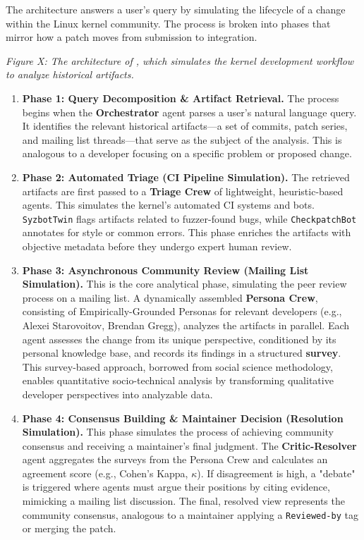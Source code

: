 The \sys architecture answers a user's query by simulating the lifecycle of a change within the Linux kernel community. The process is broken into phases that mirror how a patch moves from submission to integration.

\emph{Figure X: The architecture of \sys, which simulates the kernel development workflow to analyze historical artifacts.}

\begin{enumerate}
\item \textbf{Phase 1: Query Decomposition \& Artifact Retrieval.} The process begins when the \textbf{Orchestrator} agent parses a user's natural language query. It identifies the relevant historical artifacts—a set of commits, patch series, and mailing list threads—that serve as the subject of the analysis. This is analogous to a developer focusing on a specific problem or proposed change.

\item \textbf{Phase 2: Automated Triage (CI Pipeline Simulation).} The retrieved artifacts are first passed to a \textbf{Triage Crew} of lightweight, heuristic-based agents. This simulates the kernel's automated CI systems and bots. \texttt{SyzbotTwin} flags artifacts related to fuzzer-found bugs, while \texttt{CheckpatchBot} annotates for style or common errors. This phase enriches the artifacts with objective metadata before they undergo expert human review.

\item \textbf{Phase 3: Asynchronous Community Review (Mailing List Simulation).} This is the core analytical phase, simulating the peer review process on a mailing list. A dynamically assembled \textbf{Persona Crew}, consisting of Empirically-Grounded Personas for relevant developers (e.g., Alexei Starovoitov, Brendan Gregg), analyzes the artifacts in parallel. Each agent assesses the change from its unique perspective, conditioned by its personal knowledge base, and records its findings in a structured \textbf{survey}. This survey-based approach, borrowed from social science methodology, enables quantitative socio-technical analysis by transforming qualitative developer perspectives into analyzable data.

\item \textbf{Phase 4: Consensus Building \& Maintainer Decision (Resolution Simulation).} This phase simulates the process of achieving community consensus and receiving a maintainer's final judgment. The \textbf{Critic-Resolver} agent aggregates the surveys from the Persona Crew and calculates an agreement score (e.g., Cohen's Kappa, $\kappa$). If disagreement is high, a "debate" is triggered where agents must argue their positions by citing evidence, mimicking a mailing list discussion. The final, resolved view represents the community consensus, analogous to a maintainer applying a \texttt{Reviewed-by} tag or merging the patch.


\end{enumerate}
